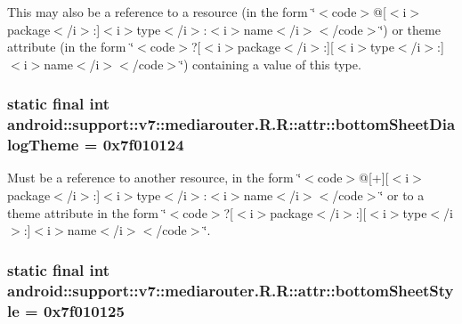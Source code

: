 This may also be a reference to a resource (in the form \char`\"{}$<$code$>$@\mbox{[}$<$i$>$package$<$/i$>$:\mbox{]}$<$i$>$type$<$/i$>$:$<$i$>$name$<$/i$>$$<$/code$>$\char`\"{}) or theme attribute (in the form \char`\"{}$<$code$>$?\mbox{[}$<$i$>$package$<$/i$>$:\mbox{]}\mbox{[}$<$i$>$type$<$/i$>$:\mbox{]}$<$i$>$name$<$/i$>$$<$/code$>$\char`\"{}) containing a value of this type. \hypertarget{classandroid_1_1support_1_1v7_1_1mediarouter_1_1_r_1_1attr_8812d264bf936bb6a065d88f6049ef86}{
\subsubsection[{bottomSheetDialogTheme}]{\setlength{\rightskip}{0pt plus 5cm}static final int android::support::v7::mediarouter.R.R::attr::bottomSheetDialogTheme = 0x7f010124}}
\label{classandroid_1_1support_1_1v7_1_1mediarouter_1_1_r_1_1attr_8812d264bf936bb6a065d88f6049ef86}


Must be a reference to another resource, in the form \char`\"{}$<$code$>$@\mbox{[}+\mbox{]}\mbox{[}$<$i$>$package$<$/i$>$:\mbox{]}$<$i$>$type$<$/i$>$:$<$i$>$name$<$/i$>$$<$/code$>$\char`\"{} or to a theme attribute in the form \char`\"{}$<$code$>$?\mbox{[}$<$i$>$package$<$/i$>$:\mbox{]}\mbox{[}$<$i$>$type$<$/i$>$:\mbox{]}$<$i$>$name$<$/i$>$$<$/code$>$\char`\"{}. \hypertarget{classandroid_1_1support_1_1v7_1_1mediarouter_1_1_r_1_1attr_c86e91bca095e7db82b2ed707ea0d61a}{
\subsubsection[{bottomSheetStyle}]{\setlength{\rightskip}{0pt plus 5cm}static final int android::support::v7::mediarouter.R.R::attr::bottomSheetStyle = 0x7f010125}}
\label{classandroid_1_1support_1_1v7_1_1mediarouter_1_1_r_1_1attr_c86e91bca095e7db82b2ed707ea0d61a}


